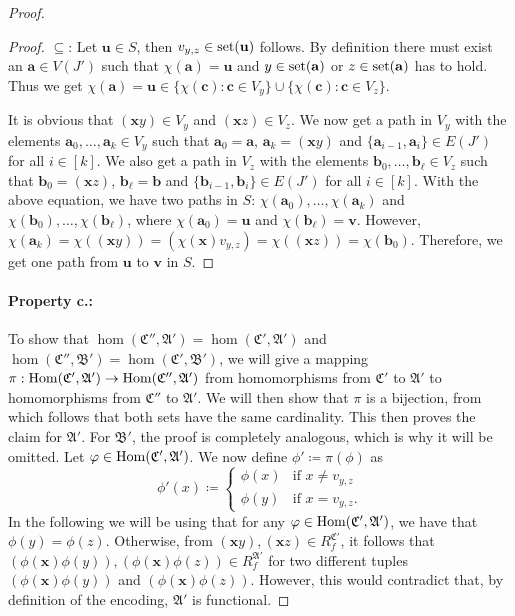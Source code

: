 \begin{proof}
\begin{proof}
		$\subseteq$:
		Let $\mathbf u\in S$, then $v_{y,z}\in \operatorname{set}(\mathbf u)$ follows.
		By definition there must exist an $\mathbf a \in V(J')$ such that $\chi(\mathbf a)=\mathbf u$ and $y\in \operatorname{set}(\mathbf a)$ or $z\in \operatorname{set}(\mathbf a)$ has to hold.
		Thus we get $\chi(\mathbf a)=\mathbf u\in \{\chi(\mathbf c) : \mathbf c\in V_y\}\cup \{\chi(\mathbf c) : \mathbf c\in V_z\}$.
		
		It is obvious that $(\mathbf xy)\in V_y$ and $(\mathbf xz)\in V_z$.
		We now get a path in $V_y$ with the elements $\mathbf a_0,\dots,\mathbf a_k\in V_y$ such that $\mathbf a_0=\mathbf a$, $\mathbf a_k=(\mathbf xy)$ and $\{\mathbf a_{i-1},\mathbf a_i\}\in E(J')$ for all $i\in [k]$.
		We also get a path in $V_z$ with the elements $\mathbf b_0,\dots,\mathbf b_\ell\in V_z$ such that $\mathbf b_0=(\mathbf xz)$, $\mathbf b_\ell = \mathbf b$ and $\{\mathbf b_{i-1},\mathbf b_i\}\in E(J')$ for all $i\in[k]$.
		With the above equation, we have two paths in $S$: $\chi(\mathbf a_0),\dots,\chi(\mathbf a_k)$ and $\chi(\mathbf b_0),\dots,\chi(\mathbf b_\ell)$, where $\chi(\mathbf a_0)=\mathbf u$ and $\chi(\mathbf b_\ell)=\mathbf v$.
		However, $\chi(\mathbf a_k)=\chi((\mathbf xy))=(\chi(\mathbf x)v_{y,z})=\chi((\mathbf xz))=\chi(\mathbf b_0)$.
		Therefore, we get one path from $\mathbf u$ to $\mathbf v$ in $S$.
	\end{proof}
	
	\paragraph*{Property c.:}
	To show that $\hom(\mathfrak C'',\mathfrak A')=\hom(\mathfrak C',\mathfrak A')$ and $\hom(\mathfrak C'',\mathfrak B')=\hom(\mathfrak C',\mathfrak B')$, we will give a mapping $\pi : \operatorname{Hom}(\mathfrak C',\mathfrak A')\to\operatorname{Hom}(\mathfrak C'',\mathfrak A')$ from homomorphisms from $\mathfrak C'$ to $\mathfrak A'$ to homomorphisms from $\mathfrak C''$ to $\mathfrak A'$.
	We will then show that $\pi$ is a bijection, from which follows that both sets have the same cardinality.
	This then proves the claim for $\mathfrak A'$.
	For $\mathfrak B'$, the proof is completely analogous, which is why it will be omitted.
	Let $\varphi\in \operatorname{Hom}(\mathfrak C',\mathfrak A')$.
	We now define $\phi'\coloneqq \pi(\phi)$ as
	$$
	\phi'(x)\coloneqq
	\begin{cases}
		\phi(x) & \text{if } x\neq v_{y,z} \\
		\phi(y) & \text{if } x = v_{y,z}.
	\end{cases}
	$$
	In the following we will be using that for any $\varphi\in\operatorname{Hom}(\mathfrak C',\mathfrak A')$, we have that $\phi(y)=\phi(z)$.
	Otherwise, from $(\mathbf xy),(\mathbf xz)\in R_f^{\mathfrak C'}$, it follows that $(\phi(\mathbf x)\phi(y)),(\phi(\mathbf x)\phi(z))\in R_f^{\mathfrak A'}$ for two different tuples $(\phi(\mathbf x)\phi(y))$ and $(\phi(\mathbf x)\phi(z))$.
	However, this would contradict that, by definition of the encoding, $\mathfrak A'$ is functional.
	

\end{proof}
